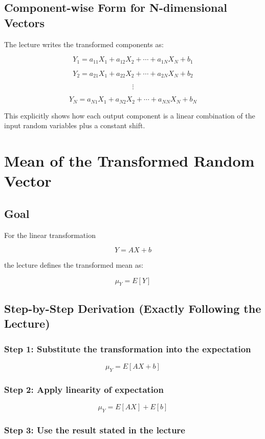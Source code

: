 \documentclass[12pt]{article}
\begin{document}
\subsection{Component-wise Form for N-dimensional Vectors}

The lecture writes the transformed components as:

\[
Y_1 = a_{11}X_1 + a_{12}X_2 + \cdots + a_{1N}X_N + b_1
\]

\[
Y_2 = a_{21}X_1 + a_{22}X_2 + \cdots + a_{2N}X_N + b_2
\]

\[
\vdots
\]

\[
Y_N = a_{N1}X_1 + a_{N2}X_2 + \cdots + a_{NN}X_N + b_N
\]

This explicitly shows how each output component is a linear combination of the input random variables plus a constant shift.

\section{Mean of the Transformed Random Vector}

\subsection{Goal}

For the linear transformation

\[
Y = AX + b
\]

the lecture defines the transformed mean as:

\[
\mu_Y = E[Y]
\]

\subsection{Step-by-Step Derivation (Exactly Following the Lecture)}

\subsubsection*{Step 1: Substitute the transformation into the expectation}

\[
\mu_Y = E[AX + b]
\]

\subsubsection*{Step 2: Apply linearity of expectation}

\[
\mu_Y = E[AX] + E[b]
\]

\subsubsection*{Step 3: Use the result stated in the lecture}
\end{document}
